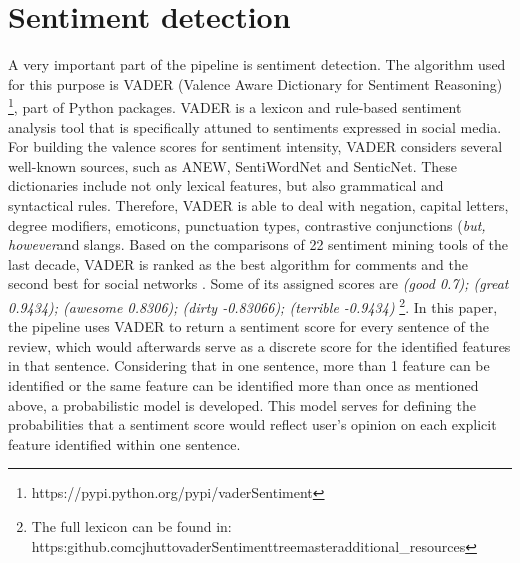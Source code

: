 \section{Sentiment detection}
A very important part of the pipeline is sentiment detection. The algorithm used for this purpose is VADER (Valence Aware Dictionary for Sentiment Reasoning) \footnote{https://pypi.python.org/pypi/vaderSentiment}, part of Python packages. VADER is a lexicon and rule-based sentiment analysis tool that is specifically attuned to sentiments expressed in social media. For building the valence scores for sentiment intensity, VADER considers several well-known sources, such as ANEW, SentiWordNet and SenticNet. These dictionaries include not only lexical features, but also grammatical and syntactical rules.
Therefore, VADER is able to deal with negation, capital letters, degree modifiers, emoticons, punctuation types, contrastive conjunctions (\textit{but, however}and slangs.  Based on the comparisons of 22 sentiment mining tools of the last decade, VADER is ranked as the best algorithm for comments and the second best for social networks \cite{ribeiro2015benchmark}. Some of its assigned scores are \textit{(good 0.7); (great 0.9434); (awesome	0.8306); (dirty -0.83066); (terrible -0.9434)} \footnote{The full lexicon can be found in: https:\/\/github.com\/cjhutto\/vaderSentiment\/tree\/master\/additional\_resources}. In this paper, the pipeline uses VADER to return a sentiment score for every sentence of the review, which would afterwards serve as a discrete score for the identified features in that sentence. Considering that in one sentence, more than 1 feature can be identified or the same feature can be identified more than once as mentioned above, a probabilistic model is developed. This model serves for defining the probabilities that a sentiment score would reflect user's opinion on each explicit feature identified within one sentence. 



